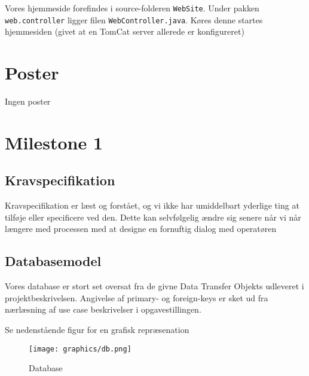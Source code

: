 \documentclass[a4paper]{article}
\begin{document}
Vores hjemmeside forefindes i source-folderen \texttt{WebSite}. Under pakken \texttt{web.controller} ligger filen \texttt{WebController.java}. Køres denne startes hjemmesiden (givet at en TomCat server allerede er konfigureret)



\clearpage

\section{Poster} %
\label{sec:Poster}

Ingen poster


\clearpage

\section{Milestone 1} %
\label{sec:Milestone 1}

\subsection{Kravspecifikation} %
\label{sub:Kravspecifikation}

Kravspecifikation er læst og forstået, og vi ikke har umiddelbart yderlige ting at tilføje eller specificere ved den. Dette kan selvfølgelig ændre sig senere når vi når længere med processen med at designe en fornuftig dialog med operatøren


\subsection{Databasemodel} %
\label{sub:Databasemodel}

Vores database er stort set oversat fra de givne Data Transfer Objekts udleveret i projektbeskrivelsen. Angivelse af primary- og foreign-keys er sket ud fra nærlæsning af use case beskrivelser i opgavestillingen.

Se nedenstående figur for en grafisk repræsenation

\begin{figure}[H]
  \centering
  \texttt{[image: graphics/db.png]}
    \caption{Database}
\end{figure}
\end{document}
